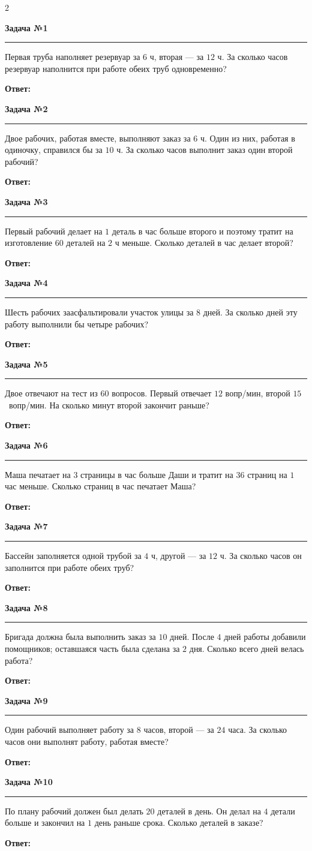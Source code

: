\documentclass[a4paper,11pt]{article}
\renewcommand{\TaskBox}[2]{%
  \par\noindent
  {\scriptsize\bfseries\color{wcprimary}Задача №#1}\par
  \nopagebreak\vspace{-0.5mm}%
  {\color{wcprimaryLight}\rule{\linewidth}{0.4pt}}\par\nopagebreak
  \vspace{0.5mm}\small #2\par\vspace{2.5mm}}
\begin{document}
\FirstPageHeader

\begin{multicols}{2}

\TaskBox{1}{Первая труба наполняет резервуар за $6$ ч, вторая — за $12$ ч. За сколько часов резервуар наполнится при работе обеих труб одновременно?\par
\hfill\textbf{Ответ:}~\AnswerField{1}}

\TaskBox{2}{Двое рабочих, работая вместе, выполняют заказ за $6$ ч. Один из них, работая в одиночку, справился бы за $10$ ч. За сколько часов выполнит заказ один второй рабочий?\par
\hfill\textbf{Ответ:}~\AnswerField{2}}

\TaskBox{3}{Первый рабочий делает на $1$ деталь в час больше второго и поэтому тратит на изготовление $60$ деталей на $2$ ч меньше. Сколько деталей в час делает второй?\par
\hfill\textbf{Ответ:}~\AnswerField{3}}

\TaskBox{4}{Шесть рабочих заасфальтировали участок улицы за $8$ дней. За сколько дней эту работу выполнили бы четыре рабочих?\par
\hfill\textbf{Ответ:}~\AnswerField{4}}

\TaskBox{5}{Двое отвечают на тест из $60$ вопросов. Первый отвечает $12$ вопр/мин, второй $15$~вопр/мин. На сколько минут второй закончит раньше?\par
\hfill\textbf{Ответ:}~\AnswerField{5}}

\TaskBox{6}{Маша печатает на $3$ страницы в час больше Даши и тратит на $36$ страниц на $1$ час меньше. Сколько страниц в час печатает Маша?\par
\hfill\textbf{Ответ:}~\AnswerField{6}}

\TaskBox{7}{Бассейн заполняется одной трубой за $4$ ч, другой — за $12$ ч. За сколько часов он заполнится при работе обеих труб?\par
\hfill\textbf{Ответ:}~\AnswerField{7}}

\TaskBox{8}{Бригада должна была выполнить заказ за $10$ дней. После $4$ дней работы добавили помощников; оставшаяся часть была сделана за $2$ дня. Сколько всего дней велась работа?\par
\hfill\textbf{Ответ:}~\AnswerField{8}}

\TaskBox{9}{Один рабочий выполняет работу за $8$ часов, второй — за $24$ часа. За сколько часов они выполнят работу, работая вместе?\par
\hfill\textbf{Ответ:}~\AnswerField{9}}

\TaskBox{10}{По плану рабочий должен был делать $20$ деталей в день. Он делал на $4$ детали больше и закончил на $1$ день раньше срока. Сколько деталей в заказе?\par
\hfill\textbf{Ответ:}~\AnswerField{10}}

\end{multicols}

\end{document}
